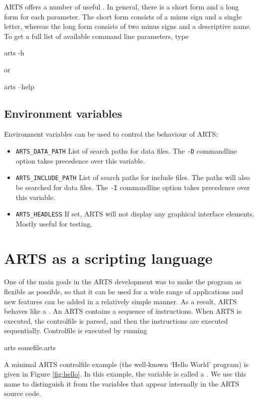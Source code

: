 ARTS offers a number of useful . In
general, there is a short form and a long form for each parameter. The
short form consists of a minus sign and a single letter, whereas the
long form consists of two minus signs and a descriptive name. To get a
full list of available command line parameters, type
\begin{code}
  arts -h
\end{code}
or
\begin{code}
  arts --help
\end{code}

\subsection{Environment variables}

Environment variables can be used to control the behaviour of ARTS:

\begin{itemize}
\item \verb|ARTS_DATA_PATH|
List of search paths for data files. The \verb|-D| commandline option
takes precedence over this variable.
\item \verb|ARTS_INCLUDE_PATH|
List of search paths for include files. The paths will also be
searched for data files. The \verb|-I| commandline option takes
precedence over this variable.
\item \verb|ARTS_HEADLESS|
If set, ARTS will not display any graphical interface elements. Mostly
useful for testing.
\end{itemize}

\section{ARTS as a scripting language}

One of the main goals in the ARTS development was to make the program
as flexible as possible, so that it can be used for a wide range of
applications and new features can be added in a relatively simple
manner. As a result, ARTS behaves like a . An ARTS  contains a sequence of
instructions. When ARTS is executed, the controlfile is parsed, and
then the instructions are executed sequentially. Controlfile
 is executed by running
\begin{code}
  arts somefile.arts
\end{code}
A minimal ARTS controlfile example (the well-known `Hello World' program) is
given in Figure \ref{fig:hello}. In this example, the variable  is
called a \emph{}. We use this name to distinguish
it from the variables that appear internally in the ARTS source code.

